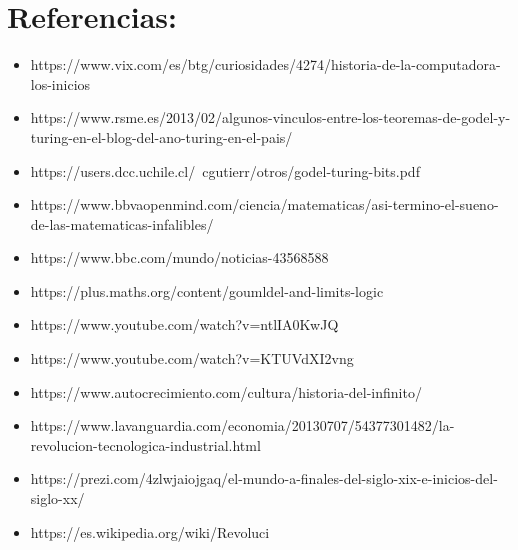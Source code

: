 \documentclass[12pt]{article}
\begin{document}
\section{Referencias: }
\begin{itemize}
    \item https://www.vix.com/es/btg/curiosidades/4274/historia-de-la-computadora-los-inicios
    
    \item https://www.rsme.es/2013/02/algunos-vinculos-entre-los-teoremas-de-godel-y-turing-en-el-blog-del-ano-turing-en-el-pais/
    
    \item https://users.dcc.uchile.cl/~cgutierr/otros/godel-turing-bits.pdf
    
    \item https://www.bbvaopenmind.com/ciencia/matematicas/asi-termino-el-sueno-de-las-matematicas-infalibles/
    
    \item https://www.bbc.com/mundo/noticias-43568588
    
    \item https://plus.maths.org/content/goumldel-and-limits-logic
    
    \item https://www.youtube.com/watch?v=ntlIA0KwJQ
    
    \item https://www.youtube.com/watch?v=KTUVdXI2vng
    
    \item https://www.autocrecimiento.com/cultura/historia-del-infinito/
    
    \item https://www.lavanguardia.com/economia/20130707/54377301482/la-revolucion-tecnologica-industrial.html
    
    \item https://prezi.com/4zlwjaiojgaq/el-mundo-a-finales-del-siglo-xix-e-inicios-del-siglo-xx/
    
    \item https://es.wikipedia.org/wiki/Revoluci%
    
    
    
    
    
    
    
    
    
\end{itemize}
\end{document}
